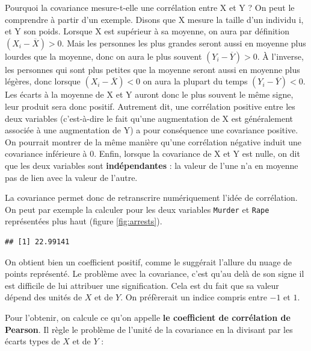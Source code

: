 \documentclass[
]{book}
\newenvironment{Shaded}{\begin{snugshade}}{\end{snugshade}}
\newcommand{\FunctionTok}[1]{\textcolor[rgb]{0.00,0.00,0.00}{#1}}
\newcommand{\NormalTok}[1]{#1}
\newcommand{\SpecialCharTok}[1]{\textcolor[rgb]{0.00,0.00,0.00}{#1}}
\begin{document}
Pourquoi la covariance mesure-t-elle une corrélation entre X et Y ? On
peut le comprendre à partir d'un exemple. Disons que X mesure la taille
d'un individu i, et Y son poids. Lorsque X est supérieur à sa moyenne, on
aura par définition \((X_i - \overline{X}) > 0\). Mais les personnes les
plus grandes seront aussi en moyenne plus lourdes que la moyenne, donc
on aura le plus souvent \((Y_i - \overline{Y}) > 0\). À l'inverse, les
personnes qui sont plus petites que la moyenne seront aussi en moyenne
plus légères, donc lorsque \((X_i - \overline{X}) < 0\) on aura la plupart
du temps \((Y_i - \overline{Y}) < 0\). Les écarts à la moyenne de X et Y
auront donc le plus souvent le même signe, leur produit sera donc
positif. Autrement dit, une corrélation positive entre les deux
variables (c'est-à-dire le fait qu'une augmentation de X est
généralement associée à une augmentation de Y) a pour conséquence une
covariance positive. On pourrait montrer de la même manière qu'une
corrélation négative induit une covariance inférieure à 0. Enfin,
lorsque la covariance de X et Y est nulle, on dit que les deux variables
sont \textbf{indépendantes} : la valeur de l'une n'a en moyenne pas de lien
avec la valeur de l'autre.

La covariance permet donc de retranscrire numériquement l'idée de
corrélation. On peut par exemple la calculer pour les deux variables \texttt{Murder}
et \texttt{Rape} représentées plus haut (figure \ref{fig:arrests}).

\begin{Shaded}
\end{Shaded}

\begin{verbatim}
## [1] 22.99141
\end{verbatim}

On obtient bien un coefficient positif, comme le suggérait l'allure du nuage de
points représenté. Le problème avec la covariance, c'est qu'au delà de
son signe il est difficile de lui attribuer une signification. Cela est
du fait que sa valeur dépend des unités de \(X\) et de \(Y\). On préfèrerait
un indice compris entre \(-1\) et \(1\).

Pour l'obtenir, on calcule ce qu'on appelle \textbf{le coefficient de corrélation de Pearson}. Il règle le problème de l'unité de la covariance en la divisant par les écarts types de \(X\) et de \(Y\) :
\end{document}
